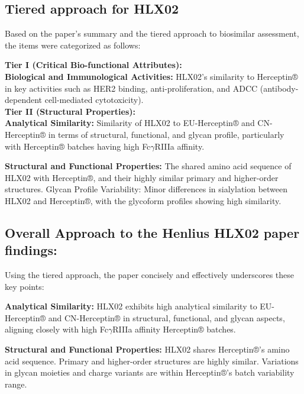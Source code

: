 \documentclass[
  12pt,
  a4paper,
]{article}
\numberwithin{equation}{section}
\theoremstyle{plain}
\theoremstyle{definition}
\theoremstyle{remark}
\theoremstyle{note}
\begin{document}
\hypertarget{tiered-approach-for-hlx02}{%
\subsection{Tiered approach for HLX02}\label{tiered-approach-for-hlx02}}

Based on the paper's summary and the tiered approach to biosimilar
assessment, the items were categorized as follows:

\textbf{Tier I (Critical Bio-functional Attributes):}\\
\textbf{Biological and Immunological Activities:} HLX02's similarity to
Herceptin® in key activities such as HER2 binding, anti-proliferation,
and ADCC (antibody-dependent cell-mediated cytotoxicity).\\

\textbf{Tier II (Structural Properties):}\\
\textbf{Analytical Similarity:} Similarity of HLX02 to EU-Herceptin® and
CN-Herceptin® in terms of structural, functional, and glycan profile,
particularly with Herceptin® batches having high Fc\(\gamma\)RIIIa
affinity.

\textbf{Structural and Functional Properties:} The shared amino acid
sequence of HLX02 with Herceptin®, and their highly similar primary and
higher-order structures. Glycan Profile Variability: Minor differences
in sialylation between HLX02 and Herceptin®, with the glycoform profiles
showing high similarity.

\hypertarget{overall-approach-to-the-henlius-hlx02-paper-findings}{%
\subsection{Overall Approach to the Henlius HLX02 paper
findings:}\label{overall-approach-to-the-henlius-hlx02-paper-findings}}

Using the tiered approach, the paper concisely and effectively
underscores these key points:

\textbf{Analytical Similarity:} HLX02 exhibits high analytical
similarity to EU-Herceptin® and CN-Herceptin® in structural, functional,
and glycan aspects, aligning closely with high Fc\(\gamma\)RIIIa
affinity Herceptin® batches.

\textbf{Structural and Functional Properties:} HLX02 shares Herceptin®'s
amino acid sequence. Primary and higher-order structures are highly
similar. Variations in glycan moieties and charge variants are within
Herceptin®'s batch variability range.
\end{document}

